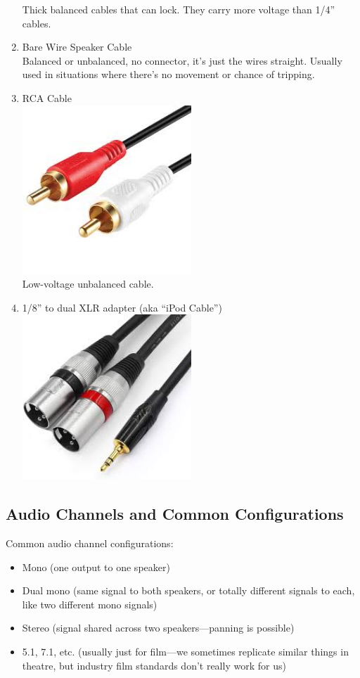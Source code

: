 \documentclass[a4paper]{article}
\begin{document}
\begin{enumerate}
		Thick balanced cables that can lock. They carry more voltage
		than 1/4'' cables.
	\item Bare Wire Speaker Cable\\
		Balanced or unbalanced, no connector, it's just the wires
		straight. Usually used in situations where there's no movement
		or chance of tripping.
	\item RCA Cable\\
		\includegraphics[width=0.5\textwidth]{RCA.jpeg}\\
		Low-voltage unbalanced cable.
	\item 1/8'' to dual XLR adapter (aka ``iPod Cable'')\\
		\includegraphics[width=0.5\textwidth]{18XLR.jpeg}\\
\end{enumerate}

\subsection{Audio Channels and Common Configurations}
Common audio channel configurations:
\begin{itemize}
	\item Mono (one output to one speaker)
	\item Dual mono (same signal to both speakers, or totally different
		signals to each, like two different mono signals)
	\item Stereo (signal shared across two speakers---panning is possible)
	\item 5.1, 7.1, etc. (usually just for film---we sometimes replicate
		similar things in theatre, but industry film standards don't
		really work for us)
\end{itemize}
\end{document}
